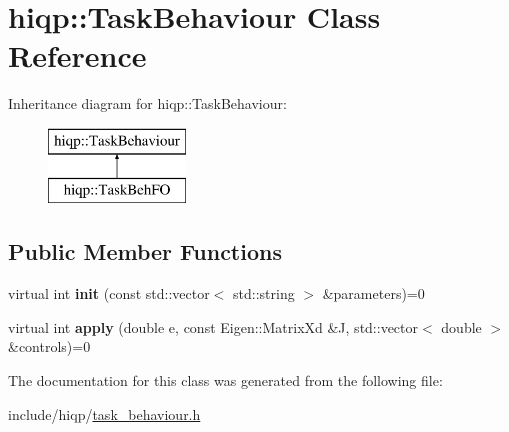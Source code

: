 \hypertarget{classhiqp_1_1TaskBehaviour}{\section{hiqp\-:\-:Task\-Behaviour Class Reference}
\label{classhiqp_1_1TaskBehaviour}
}
Inheritance diagram for hiqp\-:\-:Task\-Behaviour\-:\begin{figure}[H]
\begin{center}
\leavevmode
\includegraphics[height=2.000000cm]{classhiqp_1_1TaskBehaviour}
\end{center}
\end{figure}
\subsection*{Public Member Functions}
\begin{DoxyCompactItemize}
\item 
\hypertarget{classhiqp_1_1TaskBehaviour_acffdda2b407d55672ed9c7cb78c663ae}{virtual int {\bfseries init} (const std\-::vector$<$ std\-::string $>$ \&parameters)=0}\label{classhiqp_1_1TaskBehaviour_acffdda2b407d55672ed9c7cb78c663ae}

\item 
\hypertarget{classhiqp_1_1TaskBehaviour_aac31dd97622dfe8ed812f44c2e9d5d1e}{virtual int {\bfseries apply} (double e, const Eigen\-::\-Matrix\-Xd \&J, std\-::vector$<$ double $>$ \&controls)=0}\label{classhiqp_1_1TaskBehaviour_aac31dd97622dfe8ed812f44c2e9d5d1e}

\end{DoxyCompactItemize}


The documentation for this class was generated from the following file\-:\begin{DoxyCompactItemize}
\item 
include/hiqp/\hyperlink{task__behaviour_8h}{task\-\_\-behaviour.\-h}\end{DoxyCompactItemize}
